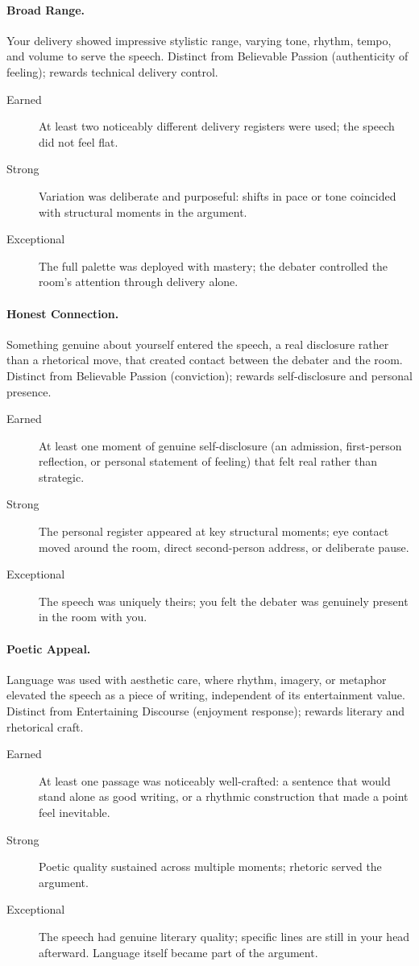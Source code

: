 \documentclass[12pt]{article}
\begin{document}
\paragraph{Broad Range.} Your delivery showed impressive stylistic range, varying tone, rhythm, tempo, and volume to serve the speech. Distinct from Believable Passion (authenticity of feeling); rewards technical delivery control.
\begin{description}
    \item[Earned] At least two noticeably different delivery registers were used; the speech did not feel flat.
    \item[Strong] Variation was deliberate and purposeful: shifts in pace or tone coincided with structural moments in the argument.
    \item[Exceptional] The full palette was deployed with mastery; the debater controlled the room's attention through delivery alone.
\end{description}

\paragraph{Honest Connection.} Something genuine about yourself entered the speech, a real disclosure rather than a rhetorical move, that created contact between the debater and the room. Distinct from Believable Passion (conviction); rewards self-disclosure and personal presence.
\begin{description}
    \item[Earned] At least one moment of genuine self-disclosure (an admission, first-person reflection, or personal statement of feeling) that felt real rather than strategic.
    \item[Strong] The personal register appeared at key structural moments; eye contact moved around the room, direct second-person address, or deliberate pause.
    \item[Exceptional] The speech was uniquely theirs; you felt the debater was genuinely present in the room with you.
\end{description}

\paragraph{Poetic Appeal.} Language was used with aesthetic care, where rhythm, imagery, or metaphor elevated the speech as a piece of writing, independent of its entertainment value. Distinct from Entertaining Discourse (enjoyment response); rewards literary and rhetorical craft.
\begin{description}
    \item[Earned] At least one passage was noticeably well-crafted: a sentence that would stand alone as good writing, or a rhythmic construction that made a point feel inevitable.
    \item[Strong] Poetic quality sustained across multiple moments; rhetoric served the argument.
    \item[Exceptional] The speech had genuine literary quality; specific lines are still in your head afterward. Language itself became part of the argument.
\end{description}
\end{document}
